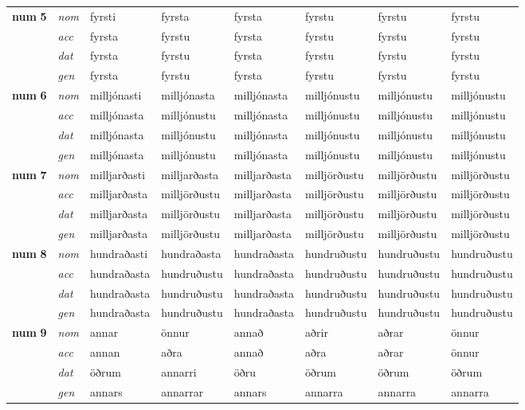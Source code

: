 \begin{longtable}[l]{l>{\footnotesize\itshape}lXXXXXX}
\multirow{3}{*}{{{\textbf{num} \Large{\textbf{5}}}}}  &  nom & fyrsti & fyrsta    & fyrsta & fyrstu & fyrstu & fyrstu \\*
  & acc &  fyrsta  & fyrstu   & fyrsta & fyrstu & fyrstu & fyrstu \\*
&  dat & fyrsta & fyrstu   & fyrsta & fyrstu & fyrstu & fyrstu \\*
  & gen & fyrsta  & fyrstu  & fyrsta & fyrstu & fyrstu & fyrstu\\
\cmidrule{1-8}

\multirow{3}{*}{{{\textbf{num} \Large{\textbf{6}}}}}  &  nom & milljónasti & milljónasta    & milljónasta & milljónustu & milljónustu & milljónustu \\*
  & acc &  milljónasta  & milljónustu   & milljónasta & milljónustu & milljónustu & milljónustu \\*
&  dat & milljónasta & milljónustu   & milljónasta & milljónustu & milljónustu & milljónustu \\*
  & gen & milljónasta  & milljónustu  & milljónasta & milljónustu & milljónustu & milljónustu\\
\cmidrule{1-8}

\multirow{3}{*}{{{\textbf{num} \Large{\textbf{7}}}}}  &  nom & milljarðasti & milljarðasta    & milljarðasta & milljörðustu & milljörðustu & milljörðustu \\*
  & acc &  milljarðasta  & milljörðustu   & milljarðasta & milljörðustu & milljörðustu & milljörðustu \\*
&  dat & milljarðasta & milljörðustu   & milljarðasta & milljörðustu & milljörðustu & milljörðustu \\*
  & gen & milljarðasta  & milljörðustu  & milljarðasta & milljörðustu & milljörðustu & milljörðustu\\
\cmidrule{1-8}

\multirow{3}{*}{{{\textbf{num} \Large{\textbf{8}}}}}  &  nom & hundraðasti & hundraðasta    & hundraðasta & hundruðustu & hundruðustu & hundruðustu \\*
  & acc &  hundraðasta  & hundruðustu   & hundraðasta & hundruðustu & hundruðustu & hundruðustu \\*
&  dat & hundraðasta & hundruðustu   & hundraðasta & hundruðustu & hundruðustu & hundruðustu \\*
  & gen & hundraðasta  & hundruðustu  & hundraðasta & hundruðustu & hundruðustu & hundruðustu\\
\cmidrule{1-8}

\multirow{3}{*}{{{\textbf{num} \Large{\textbf{9}}}}}  &  nom & annar & önnur    & annað & aðrir & aðrar & önnur \\*
  & acc &  annan  & aðra   & annað & aðra & aðrar & önnur \\*
&  dat & öðrum & annarri   & öðru & öðrum & öðrum & öðrum \\*
  & gen & annars  & annarrar  & annars & annarra & annarra & annarra\\
\cmidrule{1-8}
\bottomrule
\end{longtable}
